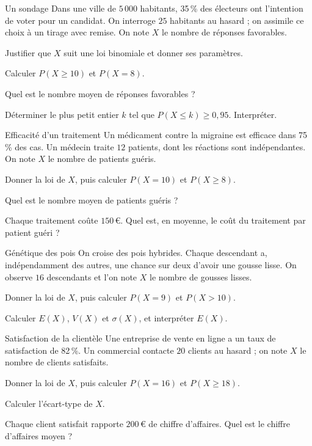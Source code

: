 
\begin{exercice}[2]{Un sondage}
Dans une ville de $5\,000$ habitants, 35\,\% des électeurs ont l'intention de voter pour un candidat. On interroge $25$ habitants
au hasard ; on assimile ce choix à un tirage avec remise. On note $X$ le nombre de réponses favorables.
\begin{questions}
  \item Justifier que $X$ suit une loi binomiale et donner ses paramètres.
  \item Calculer $P(X\geq10)$ et $P(X=8)$.
  \item Quel est le nombre moyen de réponses favorables ?
  \item Déterminer le plus petit entier $k$ tel que $P(X\leq k)\geq0{,}95$. Interpréter.
\end{questions}
\end{exercice}

\begin{exercice}[2]{Efficacité d'un traitement}
Un médicament contre la migraine est efficace dans 75\,\% des cas. Un médecin traite $12$ patients, dont les réactions sont
indépendantes. On note $X$ le nombre de patients guéris.
\begin{questions}
  \item Donner la loi de $X$, puis calculer $P(X=10)$ et $P(X\geq8)$.
  \item Quel est le nombre moyen de patients guéris ?
  \item Chaque traitement coûte $150$\,€. Quel est, en moyenne, le coût du traitement par patient guéri ?
\end{questions}
\end{exercice}

\begin{exercice}[2]{Génétique des pois}
On croise des pois hybrides. Chaque descendant a, indépendamment des autres, une chance sur deux d'avoir une gousse lisse. On
observe $16$ descendants et l'on note $X$ le nombre de gousses lisses.
\begin{questions}
  \item Donner la loi de $X$, puis calculer $P(X=9)$ et $P(X>10)$.
  \item Calculer $E(X)$, $V(X)$ et $\sigma(X)$, et interpréter $E(X)$.
\end{questions}
\end{exercice}

\begin{exercice}[2]{Satisfaction de la clientèle}
Une entreprise de vente en ligne a un taux de satisfaction de 82\,\%. Un commercial contacte $20$ clients au hasard ; on note $X$
le nombre de clients satisfaits.
\begin{questions}
  \item Donner la loi de $X$, puis calculer $P(X=16)$ et $P(X\geq18)$.
  \item Calculer l'écart-type de $X$.
  \item Chaque client satisfait rapporte $200$\,€ de chiffre d'affaires. Quel est le chiffre d'affaires moyen ?
\end{questions}
\end{exercice}

